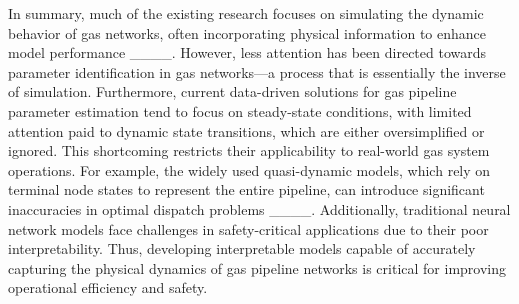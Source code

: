 In summary, much of the existing research focuses on simulating the dynamic behavior of gas networks, often incorporating physical information to enhance model performance ____. 
However, less attention has been directed towards parameter identification in gas networks—a process that is essentially the inverse of simulation. 
Furthermore, current data-driven solutions for gas pipeline parameter estimation tend to focus on steady-state conditions, with limited attention paid to dynamic state transitions, which are either oversimplified or ignored. 
This shortcoming restricts their applicability to real-world gas system operations. 
For example, the widely used quasi-dynamic models, which rely on terminal node states to represent the entire pipeline, can introduce significant inaccuracies in optimal dispatch problems ____. 
Additionally, traditional neural network models face challenges in safety-critical applications due to their poor interpretability. 
Thus, developing interpretable models capable of accurately capturing the physical dynamics of gas pipeline networks is critical for improving operational efficiency and safety.